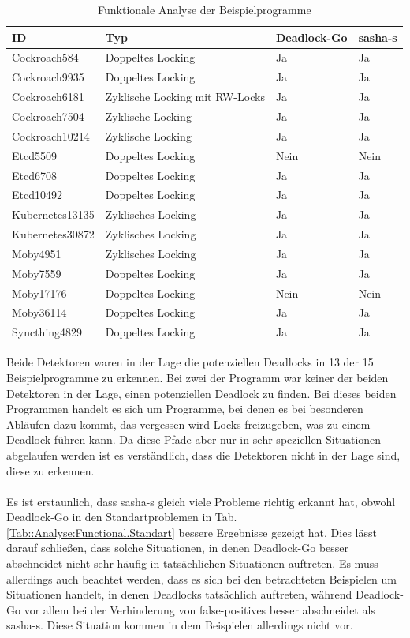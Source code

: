 \begin{table}[H]
\centering
\begin{tabular}{|l|l|l|l|}
\hline
\textbf{ID} & \textbf{Typ} &\textbf{Deadlock-Go} & \textbf{sasha-s} \\ \hline
Cockroach584 & Doppeltes Locking & Ja & Ja \\ \hline
Cockroach9935 & Doppeltes Locking & Ja & Ja \\ \hline
Cockroach6181 & Zyklische Locking mit RW-Locks& Ja & Ja \\ \hline
Cockroach7504 & Zyklische Locking & Ja & Ja \\ \hline
Cockroach10214 & Zyklische Locking & Ja & Ja \\ \hline
Etcd5509 & Doppeltes Locking & Nein & Nein \\ \hline
Etcd6708 & Doppeltes Locking & Ja & Ja \\ \hline
Etcd10492 & Doppeltes Locking & Ja & Ja \\ \hline
Kubernetes13135 & Zyklisches Locking & Ja & Ja \\ \hline
Kubernetes30872 & Zyklisches Locking & Ja & Ja \\ \hline
Moby4951 & Zyklisches Locking & Ja & Ja \\ \hline
Moby7559 & Doppeltes Locking & Ja & Ja \\ \hline
Moby17176 & Doppeltes Locking & Nein & Nein \\ \hline
Moby36114 & Doppeltes Locking & Ja & Ja \\ \hline
Syncthing4829 & Doppeltes Locking & Ja & Ja \\ \hline
\end{tabular}
\caption{Funktionale Analyse der Beispielprogramme}
\label{Tab::Analyse:Functional.Example}
\end{table}
Beide Detektoren waren in der Lage die potenziellen Deadlocks in 13 der 15 
Beispielprogramme zu erkennen. Bei zwei der Programm war keiner der beiden Detektoren 
in der Lage, einen potenziellen Deadlock zu finden. Bei dieses beiden 
Programmen handelt es sich um Programme, bei denen es bei besonderen 
Abläufen dazu kommt, das vergessen wird Locks freizugeben, was zu einem Deadlock 
führen kann. Da diese Pfade aber nur in sehr speziellen Situationen abgelaufen 
werden ist es verständlich, dass die Detektoren nicht in der Lage sind, diese 
zu erkennen.\\\\
Es ist erstaunlich, dass sasha-s gleich viele Probleme richtig erkannt hat, obwohl 
Deadlock-Go in den Standartproblemen in Tab. \ref{Tab::Analyse:Functional.Standart}
bessere Ergebnisse gezeigt hat. Dies lässt darauf schließen, dass solche 
Situationen, in denen Deadlock-Go besser abschneidet nicht sehr häufig 
in tatsächlichen Situationen auftreten. Es muss allerdings auch beachtet werden, 
dass es sich bei den betrachteten Beispielen um Situationen handelt, in denen
Deadlocks tatsächlich auftreten, während Deadlock-Go vor allem bei der 
Verhinderung von false-positives besser abschneidet als sasha-s. Diese 
Situation kommen in dem Beispielen allerdings nicht vor.


